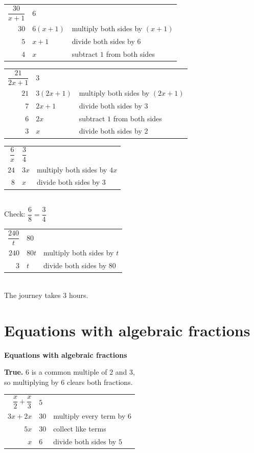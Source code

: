 \documentclass[aspectratio=169]{beamer}
\makeatletter
\newcommand{\qtopic}[1]{%
  \section{#1}%
  \begin{frame}
    \vfill
    \begin{center}
      {\usebeamercolor[fg]{structure}\Huge\bfseries #1}
    \end{center}
    \vfill
  \end{frame}%
}
\newcommand{\steps}[1]{%
  \begin{tabular}{@{}r@{${}={}$}l@{\qquad}l@{}}#1\end{tabular}%
}
\newcommand{\by}[1]{{\normalsize #1}}
\makeatother
\begin{document}
  {\steps{$\dfrac{30}{x+1}$ & $6$ & \\[0.95em]
          $30$ & $6(x+1)$ & \by{multiply both sides by $(x+1)$}\\
          $5$ & $x+1$ & \by{divide both sides by $6$}\\
          $4$ & $x$ & \by{subtract $1$ from both sides}}}

  {\steps{$\dfrac{21}{2x+1}$ & $3$ & \\[0.95em]
          $21$ & $3(2x+1)$ & \by{multiply both sides by $(2x+1)$}\\
          $7$ & $2x+1$ & \by{divide both sides by $3$}\\
          $6$ & $2x$ & \by{subtract $1$ from both sides}\\
          $3$ & $x$ & \by{divide both sides by $2$}}}

  {\steps{$\dfrac{6}{x}$ & $\dfrac{3}{4}$ & \\[0.95em]
          $24$ & $3x$ & \by{multiply both sides by $4x$}\\
          $8$ & $x$ & \by{divide both sides by $3$}}\\[0.4em]
   Check: $\dfrac{6}{8}=\dfrac{3}{4}$}

  {\steps{$\dfrac{240}{t}$ & $80$ & \\[0.95em]
          $240$ & $80t$ & \by{multiply both sides by $t$}\\
          $3$ & $t$ & \by{divide both sides by $80$}}\\[0.4em]
   The journey takes $3$ hours.}

\qtopic{Equations with algebraic fractions}

  {\textbf{True.} $6$ is a common multiple of $2$ and $3$,\\
   so multiplying by $6$ clears both fractions.
   \par\vspace{0.4em}
   \steps{$\dfrac{x}{2}+\dfrac{x}{3}$ & $5$ & \\[0.95em]
          $3x+2x$ & $30$ & \by{multiply every term by $6$}\\
          $5x$ & $30$ & \by{collect like terms}\\
          $x$ & $6$ & \by{divide both sides by $5$}}}
\end{document}
